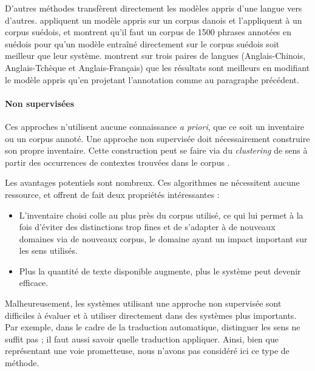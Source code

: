 
D'autres méthodes transfèrent directement les modèles appris d'une langue vers
d'autres. \citep{zeman2008cross} appliquent un modèle appris sur un corpus
danois et l'appliquent à un corpus suédois, et montrent qu'il faut un corpus de
1500 phrases annotées en suédois pour qu'un modèle entraîné directement sur le
corpus suédois soit meilleur que leur système. \citep{kozhevnikov2013cross}
montrent sur trois paires de langues (Anglais-Chinois, Anglais-Tchèque et
Anglais-Français) que les résultats sont meilleurs en modifiant le modèle
appris qu'en projetant l'annotation comme au paragraphe précédent.

\paragraph{Non supervisées}

Ces approches n'utilisent aucune connaissance \textit{a priori}, que ce soit un
inventaire ou un corpus annoté. Une approche non supervisée doit nécessairement
construire son propre inventaire. Cette construction peut se faire via du
\textit{clustering} de sens à partir des occurrences de contextes trouvées dans
le corpus
\citep{lang2011unsupervised,garg2012unsupervised,titov2012bayesian,materna2013parameter}.

Les avantages potentiels sont nombreux. Ces algorithmes ne nécessitent aucune
ressource, et offrent de fait deux propriétés intéressantes :

\begin{itemize}

    \item L'inventaire choisi colle au plus près du corpus utilisé, ce qui lui
        permet à la fois d'éviter des distinctions trop fines et de s'adapter à
        de nouveaux domaines via de nouveaux corpus, le domaine ayant un impact
        important sur les sens utilisés.

    \item Plus la quantité de texte disponible augmente, plus le système peut
        devenir efficace.

\end{itemize}

Malheureusement, les systèmes utilisant une approche non supervisée sont
difficiles à évaluer et à utiliser directement dans des systèmes plus
importants. Par exemple, dans le cadre de la traduction automatique, distinguer
les sens ne suffit pas ; il faut aussi savoir quelle traduction appliquer.
Ainsi, bien que représentant une voie prometteuse, nous n'avons pas considéré
ici ce type de méthode.

